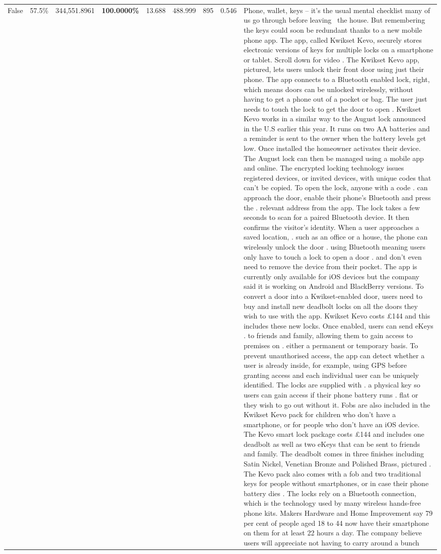 \begin{table}[H]
\begin{tabular}{lllrlllll}
False & 57.5\% & 344,551.8961 & \bfseries \color{red} 100.0000\% & 13.688 & 488.999 & 895 & 0.546 & Phone, wallet, keys – it’s the usual mental checklist many of us go through before leaving  the house. But remembering the keys could soon be redundant thanks to a new mobile phone app. The app, called Kwikset Kevo, securely stores electronic versions of keys for multiple locks on a smartphone or tablet. Scroll down for video . The Kwikset Kevo app, pictured, lets users unlock their front door using just their phone. The app connects to a Bluetooth enabled lock, right, which means doors can be unlocked wirelessly, without having to get a phone out of a pocket or bag. The user just needs to touch the lock to get the door to open . Kwikset Kevo works in a similar way to the August lock announced in the U.S earlier this year. It runs on two AA batteries and a reminder is sent to the owner when the battery levels get low. Once installed the homeowner activates their device. The August lock can then be managed using a mobile app and online. The encrypted locking technology issues registered devices, or invited devices, with unique codes that can't be copied. To open the lock, anyone with a code . can approach the door, enable their phone's Bluetooth and press the . relevant address from the app. The lock takes a few seconds to scan for a paired Bluetooth device. It then confirms the visitor's identity. When a user approaches a saved location, . such as an office or a house, the phone can wirelessly unlock the door . using Bluetooth meaning users only have to touch a lock to open a door . and don't even need to remove the device from their pocket. The app is currently only available for iOS devices but the company said it is working on Android and BlackBerry versions. To convert a door into a Kwikset-enabled door, users need to buy and install new deadbolt locks on all the doors they wish to use with the app. Kwikset Kevo costs £144 and this includes these new locks. Once enabled, users can send eKeys . to friends and family, allowing them to gain access to premises on . either a permanent or temporary basis. To prevent unauthorised access, the app can detect whether a user is already inside, for example, using GPS before granting access and each individual user can be uniquely identified. The locks are supplied with . a physical key so users can gain access if their phone battery runs . flat or they wish to go out without it. Fobs are also included in the Kwikset Kevo pack for children who don't have a smartphone, or for people who don't have an iOS device. The Kevo smart lock package costs £144 and includes one deadbolt as well as two eKeys that can be sent to friends and family. The deadbolt comes in three finishes including Satin Nickel, Venetian Bronze and Polished Brass, pictured . The Kevo pack also comes with a fob and two traditional keys for people without smartphones, or in case their phone battery dies . The locks rely on a Bluetooth connection, which is the technology used by many wireless hands-free phone kits. Makers Hardware and Home Improvement say 79 per cent of people aged 18 to 44 now have their smartphone on them for at least 22 hours a day. The company believe users will appreciate not having to carry around a bunch 
\end{tabular}
\end{table}
